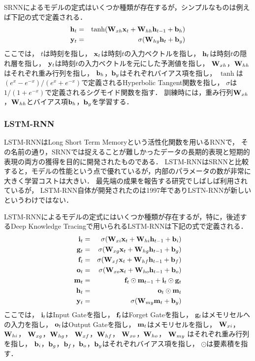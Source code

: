 SRNNによるモデルの定式はいくつか種類が存在するが，シンプルなものは例えば下記の式で定義される．
\begin{eqnarray}
\label{eq:srnn1}
{\bf h}_t &=& \tanh({\bf W}_{xh} {\bf x}_t + {\bf W}_{hh}  {\bf h}_{t-1} + {\bf b}_h)\\
\label{eq:srnn2}
{\bf y}_t &=& \sigma( {\bf W}_{hy} {\bf h}_t + {\bf b}_y)
\end{eqnarray}
ここでは，
$t$は時刻を指し，
${\bf x}_t$は時刻$t$の入力ベクトルを指し，
${\bf h}_t$は時刻$t$の隠れ層を指し，
${\bf y}_t$は時刻$t$の入力ベクトルを元にした予測値を指し，
${\bf W}_{xh}$，${\bf W}_{hh}$はそれぞれ重み行列を指し，
${\bf b}_h$，${\bf b}_y$はそれぞれバイアス項を指し，
$\tanh$は$( e^x - e^{-x} )/( e^x + e^{-x} )$で定義されるHyperbolic Tangent関数を指し，
$\sigma$は$1 / (1 + e^{-x})$で定義されるシグモイド関数を指す．
訓練時には，重み行列${\bf W}_{xh}$，${\bf W}_{hh}$とバイアス項${\bf b}_h$，${\bf b}_y$を学習する．


\subsubsection{LSTM-RNN}
LSTM-RNNはLong Short Term Memoryという活性化関数を用いるRNNで，
その名前の通り，SRNNでは捉えることが難しかったデータの長期的表現と短期的表現の両方の獲得を目的に開発されたものである\cite{hochreiter1997long}．
LSTM-RNNはSRNNと比較すると，モデルの性能という点で優れているが，内部のパラメータの数が非常に大きく学習コストは大きい．
最先端の成果を報告する研究でしばしば利用されているが，
LSTM-RNN自体が開発されたのは1997年でありLSTN-RNNが新しいというわけではない．

LSTM-RNNによるモデルの定式にはいくつか種類が存在するが，特に，後述するDeep Knowledge Tracing\cite{piech2015deep}で用いられるLSTM-RNNは下記の式で定義される．
\begin{eqnarray}
\label{eq:lstmrnn1}
{\bf i}_t &=& \sigma({\bf W}_{xi}{\bf x}_t + {\bf W}_{hi}{\bf h}_{t-1} + {\bf b}_i) \\
\label{eq:lstmrnn2}
{\bf g}_t &=& \sigma({\bf W}_{xg}{\bf x}_t + {\bf W}_{hg}{\bf h}_{t-1} + {\bf b}_g) \\
\label{eq:lstmrnn3}
{\bf f}_t &=& \sigma({\bf W}_{xf}{\bf x}_t + {\bf W}_{hf}{\bf h}_{t-1} + {\bf b}_f) \\
\label{eq:lstmrnn4}
{\bf o}_t &=& \sigma({\bf W}_{xo}{\bf x}_t + {\bf W}_{ho}{\bf h}_{t-1} + {\bf b}_o) \\
\label{eq:lstmrnn5}
{\bf m}_t &=& {\bf f}_t \odot {\bf m}_{t-1} + {\bf i}_t \odot {\bf g}_t \\
\label{eq:lstmrnn6}
{\bf h}_t &=& {\bf o}_t \odot {\bf m}_t  \\
\label{eq:lstmrnn7}
{\bf y}_t &=& \sigma({\bf W}_{my} {\bf m}_t + {\bf b}_y) 
\end{eqnarray}
ここでは，
${\bf i}_t$はInput Gateを指し，
${\bf f}_t$はForget Gateを指し，
${\bf g}_t$はメモリセルへの入力を指し，
${\bf o}_t$はOutput Gateを指し，
${\bf m}_t$はメモリセルを指し，
${\bf W}_{xi}$，${\bf W}_{hi}$，
${\bf W}_{xg}$，${\bf W}_{hg}$，
${\bf W}_{xf}$，${\bf W}_{hf}$，
${\bf W}_{xo}$，${\bf W}_{ho}$，
${\bf W}_{my}$
はそれぞれ重み行列を指し，
${\bf b}_i$，${\bf b}_g$，${\bf b}_f$，${\bf b}_o$，${\bf b}_y$はそれぞれバイアス項を指し，
$\odot$は要素積を指す．

